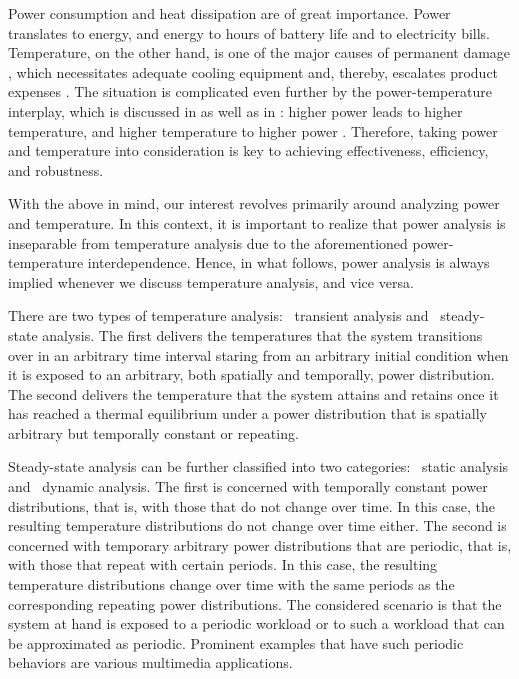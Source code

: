 Power consumption and heat dissipation are of great importance. Power translates
to energy, and energy to hours of battery life and to electricity bills.
Temperature, on the other hand, is one of the major causes of permanent damage
\cite{jedec2016}, which necessitates adequate cooling equipment and, thereby,
escalates product expenses \cite{chaudhry2015}. The situation is complicated
even further by the power-temperature interplay, which is discussed in
 as well as in : higher
power leads to higher temperature, and higher temperature to higher power
\cite{liu2007}. Therefore, taking power and temperature into consideration is
key to achieving effectiveness, efficiency, and robustness.

With the above in mind, our interest revolves primarily around analyzing power
and temperature. In this context, it is important to realize that power analysis
is inseparable from temperature analysis due to the aforementioned
power-temperature interdependence. Hence, in what follows, power analysis is
always implied whenever we discuss temperature analysis, and vice versa.

There are two types of temperature analysis: \one~transient analysis and
\two~steady-state analysis. The first delivers the temperatures that the system
transitions over in an arbitrary time interval staring from an arbitrary initial
condition when it is exposed to an arbitrary, both spatially and temporally,
power distribution. The second delivers the temperature that the system attains
and retains once it has reached a thermal equilibrium under a power distribution
that is spatially arbitrary but temporally constant or repeating.

Steady-state analysis can be further classified into two categories: \one~static
analysis and \two~dynamic analysis. The first is concerned with temporally
constant power distributions, that is, with those that do not change over time.
In this case, the resulting temperature distributions do not change over time
either. The second is concerned with temporary arbitrary power distributions
that are periodic, that is, with those that repeat with certain periods. In this
case, the resulting temperature distributions change over time with the same
periods as the corresponding repeating power distributions. The considered
scenario is that the system at hand is exposed to a periodic workload or to such
a workload that can be approximated as periodic. Prominent examples that have
such periodic behaviors are various multimedia applications.
